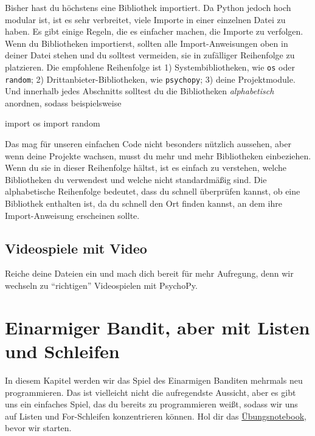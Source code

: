 \documentclass[
]{book}
\newenvironment{Shaded}{\begin{snugshade}}{\end{snugshade}}
\newcommand{\ImportTok}[1]{#1}
\newcommand{\NormalTok}[1]{#1}
\begin{document}
Bisher hast du höchstens eine Bibliothek importiert. Da Python jedoch hoch modular ist, ist es sehr verbreitet, viele Importe in einer einzelnen Datei zu haben. Es gibt einige Regeln, die es einfacher machen, die Importe zu verfolgen. Wenn du Bibliotheken importierst, sollten alle Import-Anweisungen oben in deiner Datei stehen und du solltest vermeiden, sie in zufälliger Reihenfolge zu platzieren. Die empfohlene Reihenfolge ist 1) Systembibliotheken, wie \texttt{os} oder \texttt{random}; 2) Drittanbieter-Bibliotheken, wie \texttt{psychopy}; 3) deine Projektmodule. Und innerhalb jedes Abschnitts solltest du die Bibliotheken \emph{alphabetisch} anordnen, sodass beispielsweise

\begin{Shaded}
\begin{Highlighting}[]
\ImportTok{import}\NormalTok{ os}
\ImportTok{import}\NormalTok{ random}
\end{Highlighting}
\end{Shaded}

Das mag für unseren einfachen Code nicht besonders nützlich aussehen, aber wenn deine Projekte wachsen, musst du mehr und mehr Bibliotheken einbeziehen. Wenn du sie in dieser Reihenfolge hältst, ist es einfach zu verstehen, welche Bibliotheken du verwendest und welche nicht standardmäßig sind. Die alphabetische Reihenfolge bedeutet, dass du schnell überprüfen kannst, ob eine Bibliothek enthalten ist, da du schnell den Ort finden kannst, an dem ihre Import-Anweisung erscheinen sollte.

\hypertarget{videospiele-mit-video}{%
\section{Videospiele mit Video}\label{videospiele-mit-video}}

Reiche deine Dateien ein und mach dich bereit für mehr Aufregung, denn wir wechseln zu ``richtigen'' Videospielen mit PsychoPy.

\hypertarget{One-armed-bandit}{%
\chapter{Einarmiger Bandit, aber mit Listen und Schleifen}\label{One-armed-bandit}}

In diesem Kapitel werden wir das Spiel des Einarmigen Banditen mehrmals neu programmieren. Das ist vielleicht nicht die aufregendste Aussicht, aber es gibt uns ein einfaches Spiel, das du bereits zu programmieren weißt, sodass wir uns auf Listen und For-Schleifen konzentrieren können. Hol dir das \href{notebooks/One-armed\%20bandit.ipynb}{Übungsnotebook}, bevor wir starten.
\end{document}
